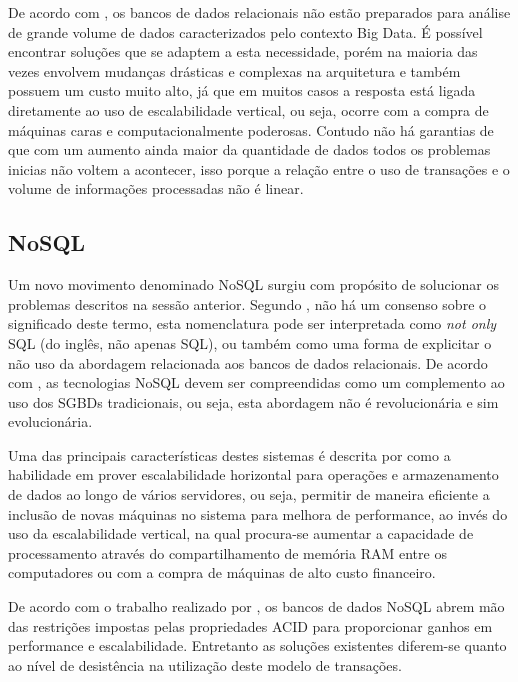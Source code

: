 De acordo com , os bancos de dados relacionais não estão preparados para análise de grande volume de dados caracterizados pelo contexto Big Data. É possível encontrar soluções que se adaptem a esta necessidade, porém na maioria das vezes envolvem mudanças drásticas e complexas na arquitetura e também possuem um custo muito alto, já que em muitos casos a resposta está ligada diretamente ao uso de escalabilidade vertical, ou seja, ocorre com a compra de máquinas caras e computacionalmente poderosas. Contudo não há garantias de que com um aumento ainda maior da quantidade de dados todos os problemas inicias não voltem a acontecer, isso porque a relação entre o uso de transações e o volume de informações processadas não é linear.

\subsection{NoSQL}

Um novo movimento denominado NoSQL surgiu com propósito de solucionar os problemas  descritos na sessão anterior. Segundo , não há um consenso sobre o significado deste termo, esta nomenclatura pode ser interpretada como \textit{not only} SQL (do inglês, não apenas SQL), ou também como uma forma de explicitar o não uso da abordagem relacionada aos bancos de dados relacionais. De acordo com , as tecnologias NoSQL devem ser compreendidas como um complemento ao uso dos SGBDs tradicionais, ou seja, esta abordagem não é revolucionária e sim evolucionária. 

Uma das principais características destes sistemas é descrita por  como a habilidade em prover escalabilidade horizontal para operações e armazenamento de dados ao longo de vários servidores, ou seja, permitir de maneira eficiente a inclusão de novas máquinas no sistema para melhora de performance, ao invés do uso da escalabilidade vertical, na qual procura-se aumentar a capacidade de processamento através do compartilhamento de memória RAM entre os computadores ou com a compra de máquinas de alto custo financeiro.

De acordo com o trabalho realizado por , os bancos de dados NoSQL abrem mão das restrições impostas pelas propriedades ACID para proporcionar ganhos em performance e escalabilidade. Entretanto as soluções existentes diferem-se quanto ao nível de desistência na utilização deste modelo de transações.

